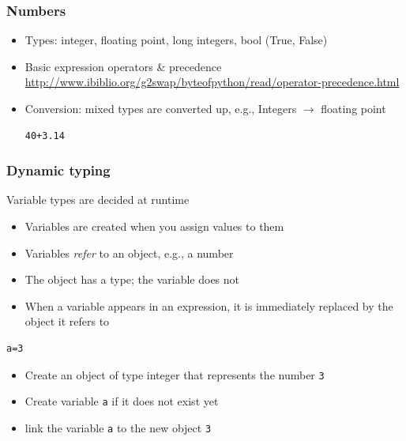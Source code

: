 \documentclass{beamer}
\begin{document}
\begin{frame}[containsverbatim]
\frametitle{Numbers}
\begin{itemize}
\item Types: integer, floating point, long integers, bool (True, False)
\item Basic expression operators \& precedence
\url{http://www.ibiblio.org/g2swap/byteofpython/read/operator-precedence.html}  
\item Conversion: mixed types are converted up, e.g., Integers $\rightarrow$ floating point
\begin{lstlisting}
40+3.14
\end{lstlisting}
\end{itemize}
\end{frame}

\begin{frame}[containsverbatim]
\frametitle{Dynamic typing}
Variable types are decided at runtime
\begin{itemize}
\item Variables are created when you assign values to them
\item Variables {\em refer} to an object, e.g., a number
\item The object has a type; the variable does not
\item When a variable appears in an expression, it is immediately replaced by the object it refers to
\end{itemize}
\begin{example}
\begin{lstlisting}
a=3
\end{lstlisting}
\begin{itemize}
\item Create an object of type integer that represents the number \texttt{3}
\item Create variable \texttt{a} if it does not exist yet
\item link the variable \texttt{a} to the new object \texttt{3}
\end{itemize}
\end{example}
\end{frame}
\end{document}

